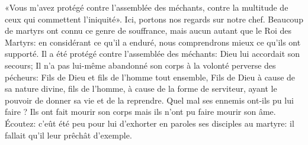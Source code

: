«Vous m’avez protégé contre l’assemblée des méchants,
	contre la multitude de ceux qui commettent l’iniquité».
Ici, portons nos regards sur notre chef.
Beaucoup de martyrs ont connu ce genre de souffrance,
	mais aucun autant que le Roi des Martyrs:
	en considérant ce qu’il a enduré,
	nous comprendrons mieux ce qu’ils ont supporté.
Il a été protégé contre l’assemblée des méchants:
	Dieu lui accordait son secours;
	Il n’a pas lui-même abandonné son corps à la volonté perverse des pécheurs:
	Fils de Dieu et fils de l’homme tout ensemble,
	Fils de Dieu à cause de sa nature divine,
	fils de l’homme, à cause de la forme de serviteur,
	ayant le pouvoir de donner sa vie et de la reprendre.
Quel mal ses ennemis ont-ils pu lui faire ?
	Ils ont fait mourir son corps mais ils n’ont pu faire mourir son âme.
Écoutez: c’eût été peu pour lui d’exhorter en paroles ses disciples au martyre:
	il fallait qu’il leur prêchât d’exemple.
